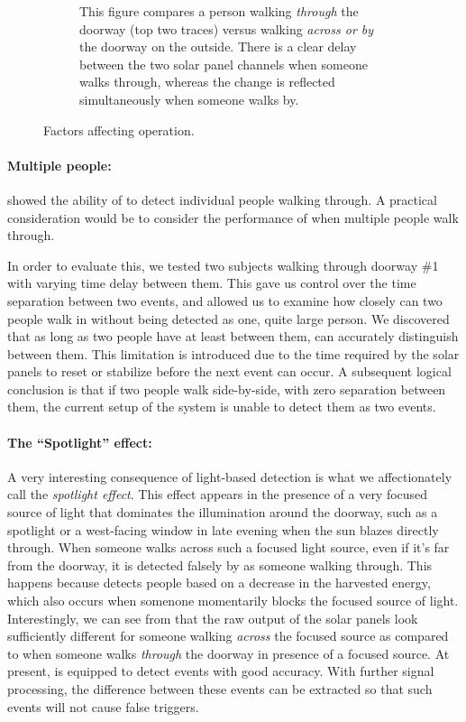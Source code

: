 \begin{figure}[t]
\begin{subfigure}[t]{0.38\textwidth}
        \caption{ This figure compares a person walking \textit{through} the doorway (top two traces) versus walking \textit{across or by} the doorway on the outside. There is a clear delay between the two solar panel channels when someone walks through, whereas the change is reflected simultaneously when someone walks by.}
        \label{fig:across}
    \end{subfigure}
    \caption{Factors affecting \sysname operation. \label{fig:confounds}}
\end{figure}


\paragraph{Multiple people:}
 showed the ability of \sysname to detect individual people walking through.
A practical consideration would be to consider the performance of \sysname when multiple people walk through.

In order to evaluate this, we tested two subjects walking through doorway \#1 with varying time delay between them.
This gave us control over the time separation between two events, and allowed us to examine how closely can two people walk in without being detected as one, quite large person.
We discovered that as long as two people have at least \minSeparation between them, \sysname can accurately distinguish between them.
This limitation is introduced due to the time required by the solar panels to reset or stabilize before the next event can occur.
A subsequent logical conclusion is that if two people walk side-by-side, \ie with zero separation between them, the current setup of the system is unable to detect them as two events.

\paragraph{The ``Spotlight'' effect:}
A very interesting consequence of light-based detection is what we affectionately call the \textit{spotlight effect}.
This effect appears in the presence of a very focused source of light that dominates the illumination around the doorway, such as a spotlight or a west-facing window in late evening when the sun blazes directly through.
When someone walks across such a focused light source, even if it's far from the doorway, it is detected falsely by \sysname as someone walking through.
This happens because \sysname detects people based on a decrease in the harvested energy, which also occurs when somenone momentarily blocks the focused source of light.
Interestingly, we can see from  that the raw output of the solar panels look sufficiently different for someone walking \textit{across} the focused source as compared to when someone walks \textit{through} the doorway in presence of a focused source.
At present, \sysname is equipped to detect events with good accuracy.
With further signal processing, the difference between these events can be extracted so that such events will not cause false triggers.


